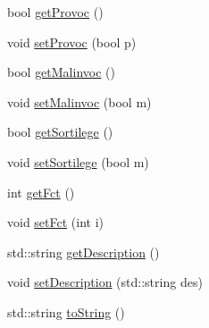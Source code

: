 \begin{DoxyCompactItemize}
\item 
bool \hyperlink{class_carte_aeaa95af6ce4e589556b3e0258a1a1fd5}{get\-Provoc} ()
\item 
void \hyperlink{class_carte_a5e107806db0095a43d360eb5aba4f268}{set\-Provoc} (bool p)
\item 
bool \hyperlink{class_carte_a7586f5cb80e50c331b85b52a99b273f1}{get\-Malinvoc} ()
\item 
void \hyperlink{class_carte_a8ae1e50c276ec598c722cc2090aa60bc}{set\-Malinvoc} (bool m)
\item 
bool \hyperlink{class_carte_a787e408176618c033f3ca3f2477d954e}{get\-Sortilege} ()
\item 
void \hyperlink{class_carte_adea41dd43ce6833bc82d515063b211b2}{set\-Sortilege} (bool m)
\item 
int \hyperlink{class_carte_abe483c0dfd894f74a7e70bd09c2f81db}{get\-Fct} ()
\item 
void \hyperlink{class_carte_a2dd4e1213a7c8ac586c899f480565e40}{set\-Fct} (int i)
\item 
std\-::string \hyperlink{class_carte_a71f1d9f42828cd1904d41072c7e1364b}{get\-Description} ()
\item 
void \hyperlink{class_carte_a969792359230516af5306af9c332e4cf}{set\-Description} (std\-::string des)
\item 
std\-::string \hyperlink{class_carte_aa87e41eb0a7e1c296e89a3f8f1bdf98b}{to\-String} ()
\end{DoxyCompactItemize}


